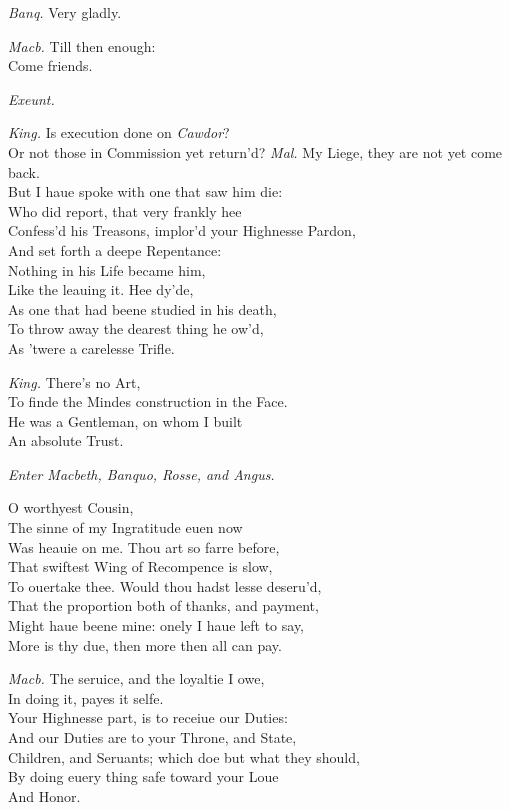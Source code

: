 \documentclass[12pt]{sides}
\newcommand{\dia}[1]{\hskip 15pt\textit{#1}\hskip 6pt}
\newcommand{\cstagedir}[1]{%
  \vspace{6pt}%
  \centerline{\textit{#1}}%
  \vspace{12pt}%
}
\begin{document}
\begin{multicols}{2}
            \dia{Banq.} Very gladly.

            \dia{Macb.} Till then enough: \\ Come friends. \cstagedir{Exeunt.}


            \dia{King.} Is execution done on \textit{Cawdor}? \\ Or not those in Commission yet return'd?
            \newline
            \dia{Mal.} My Liege, they are not yet come back. \\ But I haue spoke with one that saw him die: \\ Who did report, that very frankly hee \\ Confess'd his Treasons, implor'd your Highnesse Pardon, \\ And set forth a deepe Repentance: \\ Nothing in his Life became him, \\ Like the leauing it. Hee dy'de, \\ As one that had beene studied in his death, \\ To throw away the dearest thing he ow'd, \\ As 'twere a carelesse Trifle.

            \dia{King.} There's no Art, \\ To finde the Mindes construction in the Face. \\ He was a Gentleman, on whom I built \\ An absolute Trust.

            \centerline{\textit{Enter Macbeth, Banquo, Rosse, and Angus.}}
            O worthyest Cousin, \\ The sinne of my Ingratitude euen now \\ Was heauie on me. Thou art so farre before, \\ That swiftest Wing of Recompence is slow, \\ To ouertake thee. Would thou hadst lesse deseru'd, \\ That the proportion both of thanks, and payment, \\ Might haue beene mine: onely I haue left to say, \\ More is thy due, then more then all can pay.

            \dia{Macb.} The seruice, and the loyaltie I owe, \\ In doing it, payes it selfe. \\ Your Highnesse part, is to receiue our Duties: \\ And our Duties are to your Throne, and State, \\ Children, and Seruants; which doe but what they should, \\ By doing euery thing safe toward your Loue \\ And Honor.


\end{multicols}
\end{document}

